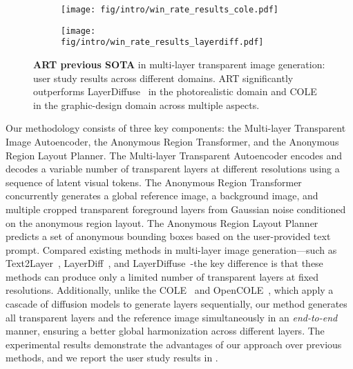 \begin{figure}[!t]
\begin{minipage}[!t]{1\linewidth}
\begin{subfigure}[b]{1\textwidth}
\centering
\texttt{[image: fig/intro/win\_rate\_results\_cole.pdf]}
\vspace{-3mm}
\end{subfigure}
\begin{subfigure}[b]{1\textwidth}
\centering
\texttt{[image: fig/intro/win\_rate\_results\_layerdiff.pdf]}
\vspace{-3mm}
\end{subfigure}
\end{minipage}
\vspace{-3mm}
\caption{\footnotesize{
\textbf{ART \vs previous SOTA} in multi-layer transparent image generation: user study results across different domains. ART significantly outperforms LayerDiffuse~\cite{zhang2024transparent} in the photorealistic domain and COLE~\cite{jia2023cole} in the graphic-design domain across multiple aspects.
}}
\label{fig:user_study}
\vspace{-3mm}
\end{figure}

Our methodology consists of three key components: the Multi-layer Transparent Image Autoencoder, the Anonymous Region Transformer, and the Anonymous Region Layout Planner. The Multi-layer Transparent Autoencoder encodes and decodes a variable number of transparent layers at different resolutions using a sequence of latent visual tokens. The Anonymous Region Transformer concurrently generates a global reference image, a background image, and multiple cropped transparent foreground layers from Gaussian noise conditioned on the anonymous region layout. The Anonymous Region Layout Planner predicts a set of anonymous bounding boxes based on the user-provided text prompt.
Compared existing methods in multi-layer image generation—such as Text2Layer~\cite{zhang2023text2layer}, LayerDiff~\cite{huang2024layerdiff}, and LayerDiffuse~\cite{zhang2024transparent}-the key difference is that these methods can produce only a limited number of transparent layers at fixed resolutions.
Additionally, unlike the COLE~\cite{jia2023cole} and OpenCOLE~\cite{inoue2024opencole}, which apply a cascade of diffusion models to generate layers sequentially, our method generates all transparent layers and the reference image simultaneously in an \textit{end-to-end} manner, ensuring a better global harmonization across different layers. The experimental results demonstrate the advantages of our approach over previous methods, and we report the user study results in .

